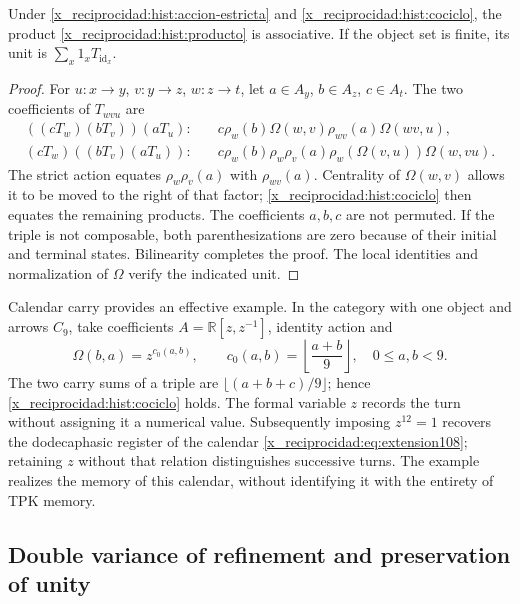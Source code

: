 \begin{proposition}
Under \eqref{x_reciprocidad:hist:accion-estricta} and \eqref{x_reciprocidad:hist:cociclo}, the product
\eqref{x_reciprocidad:hist:producto} is associative. If the object set is finite,
its unit is \(\sum_x1_xT_{\operatorname{id}_x}\).
\end{proposition}
\begin{proof}
For \(u:x\to y\), \(v:y\to z\), \(w:z\to t\), let
\(a\in A_y\), \(b\in A_z\), \(c\in A_t\). The two coefficients
of \(T_{wvu}\) are
\begin{align*}
 ((cT_w)(bT_v))(aT_u):\quad&
 c\rho_w(b)\Omega(w,v)\rho_{wv}(a)\Omega(wv,u),\\
 (cT_w)((bT_v)(aT_u)):\quad&
 c\rho_w(b)\rho_w\rho_v(a)\rho_w(\Omega(v,u))\Omega(w,vu).
\end{align*}
The strict action equates \(\rho_w\rho_v(a)\) with \(\rho_{wv}(a)\).
Centrality of \(\Omega(w,v)\) allows it to be moved to the right of
that factor; \eqref{x_reciprocidad:hist:cociclo} then equates the remaining products.
The coefficients \(a,b,c\) are not permuted. If the triple is not composable,
both parenthesizations are zero because of their initial and terminal states.
Bilinearity completes the proof. The local identities and
normalization of \(\Omega\) verify the indicated unit.
\end{proof}

Calendar carry provides an effective example. In the category
with one object and arrows \(C_9\), take coefficients
\(A=\mathbb R[z,z^{-1}]\), identity action and
\[
 \Omega(b,a)=z^{c_0(a,b)},\qquad
 c_0(a,b)=\left\lfloor\frac{a+b}{9}\right\rfloor,
 \quad 0\leq a,b<9.
\]
The two carry sums of a triple are
\(\lfloor(a+b+c)/9\rfloor\); hence
\eqref{x_reciprocidad:hist:cociclo} holds. The formal variable \(z\) records the turn without
assigning it a numerical value. Subsequently imposing \(z^{12}=1\) recovers the
dodecaphasic register of the calendar \eqref{x_reciprocidad:eq:extension108}; retaining
\(z\) without that relation distinguishes successive turns. The example realizes
the memory of this calendar, without identifying it with the entirety of TPK
memory.

\subsection{Double variance of refinement and preservation of unity}
\label{x_reciprocidad:hist:doble-varianza}

